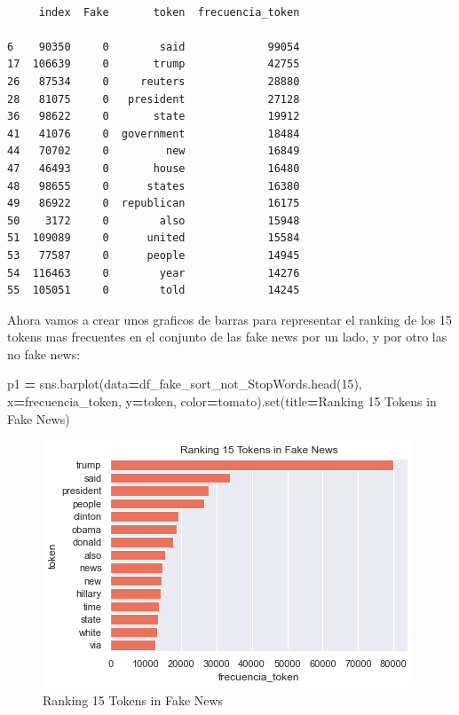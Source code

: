 \documentclass[
  11pt,
  a4paper,
]{article}
\newenvironment{Shaded}{\begin{snugshade}}{\end{snugshade}}
\newcommand{\BuiltInTok}[1]{#1}
\newcommand{\DecValTok}[1]{\textcolor[rgb]{0.00,0.00,0.81}{#1}}
\newcommand{\NormalTok}[1]{#1}
\newcommand{\OperatorTok}[1]{\textcolor[rgb]{0.81,0.36,0.00}{\textbf{#1}}}
\newcommand{\StringTok}[1]{\textcolor[rgb]{0.31,0.60,0.02}{#1}}
\begin{document}
\begin{verbatim}

     index  Fake       token  frecuencia_token
     
6    90350     0        said             99054
17  106639     0       trump             42755
26   87534     0     reuters             28880
28   81075     0   president             27128
36   98622     0       state             19912
41   41076     0  government             18484
44   70702     0         new             16849
47   46493     0       house             16480
48   98655     0      states             16380
49   86922     0  republican             16175
50    3172     0        also             15948
51  109089     0      united             15584
53   77587     0      people             14945
54  116463     0        year             14276
55  105051     0        told             14245
\end{verbatim}

Ahora vamos a crear unos graficos de barras para representar el ranking
de los 15 tokens mas frecuentes en el conjunto de las fake news por un
lado, y por otro las no fake news:

\begin{Shaded}
\begin{Highlighting}[]
\NormalTok{p1 }\OperatorTok{=}\NormalTok{ sns.barplot(data}\OperatorTok{=}\NormalTok{df\_fake\_sort\_not\_StopWords.head(}\DecValTok{15}\NormalTok{), x}\OperatorTok{=}\StringTok{\textquotesingle{}frecuencia\_token\textquotesingle{}}\NormalTok{, y}\OperatorTok{=}\StringTok{\textquotesingle{}token\textquotesingle{}}\NormalTok{, color}\OperatorTok{=}\StringTok{\textquotesingle{}tomato\textquotesingle{}}\NormalTok{).}\BuiltInTok{set}\NormalTok{(title}\OperatorTok{=}\StringTok{\textquotesingle{}Ranking 15 Tokens in Fake News\textquotesingle{}}\NormalTok{) }
\end{Highlighting}
\end{Shaded}

\begin{figure}
\centering
\includegraphics{output_63_0.png}
\caption{Ranking 15 Tokens in Fake News}
\end{figure}
\end{document}
